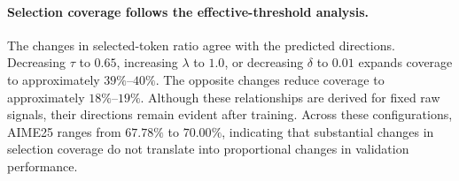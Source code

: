 \begin{table}[t]
\centering
\caption{Hyperparameter sensitivity of RLCSD on Qwen3-8B and DeepMath. Each configuration changes one parameter from the default setting. Training statistics are averaged over steps 351--400; AIME25 mean@12 is evaluated at step 400.}
\label{tab:hyperparameter-training}
\small
{}
\end{table}

\paragraph{Selection coverage follows the effective-threshold analysis.}
The changes in selected-token ratio agree with the predicted directions. Decreasing $\tau$ to $0.65$, increasing $\lambda$ to $1.0$, or decreasing $\delta$ to $0.01$ expands coverage to approximately $39\%$--$40\%$. The opposite changes reduce coverage to approximately $18\%$--$19\%$. Although these relationships are derived for fixed raw signals, their directions remain evident after training. Across these configurations, AIME25 ranges from $67.78\%$ to $70.00\%$, indicating that substantial changes in selection coverage do not translate into proportional changes in validation performance.

